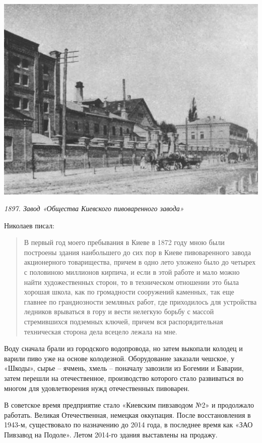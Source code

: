 \begin{center}
\includegraphics[width=0.95\linewidth]{chast-kirvys/lys02/1897-pivzavod-tov.jpg}

\textit{1897. Завод «Общества Киевского пивоваренного завода»}
\end{center}


 Николаев писал:

\begin{quotation}
В первый год моего пребывания в Киеве в 1872 году мною были построены здания наибольшего до сих пор в Киеве пивоваренного завода акционерного товарищества, причем в одно лето уложено было до четырех с половиною миллионов кирпича, и если в этой работе и мало можно найти художественных сторон, то в техническом отношении это была хорошая школа, как по громадности сооружений каменных, так еще главнее по грандиозности земляных работ, где приходилось для устройства ледников врываться в гору и вести нелегкую борьбу с массой стремившихся подземных ключей, причем вся распорядительная техническая сторона дела всецело лежала на мне. 
\end{quotation}

Воду сначала брали из городского водопровода, но затем выкопали колодец и варили пиво уже на основе колодезной. Оборудование заказали чешское, у «Шкоды», сырье – ячмень, хмель – поначалу завозили из Богемии и Баварии, затем перешли на отечественное, производство которого стало развиваться во многом для удовлетворения нужд отечественных пивоварен.

В советское время предприятие стало «Киевским пивзаводом №2» и продолжало работать. Великая Отечественная, немецкая оккупация. После восстановления в 1943-м, существовало по назначению до 2014 года, в последнее время как «ЗАО Пивзавод на Подоле». Летом 2014-го здания выставлены на продажу.

